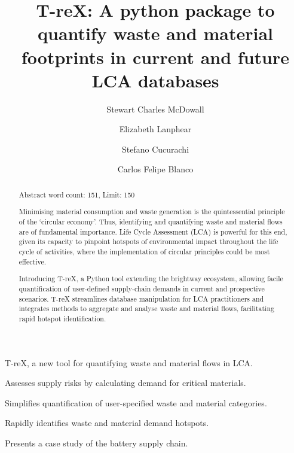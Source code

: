 \documentclass[review,3p,authoryear]{elsarticle}
\newcommand{\cbox}[1]{
    \begin{tcolorbox}[hbox, colback=red!5!white, colframe=red!65!black, boxrule=0.25pt, boxsep=2pt, left=2pt, right=2pt, top=1pt, bottom=1pt]
        \small\sffamily #1
    \end{tcolorbox}
}
\begin{document}
    \begin{highlights}
        \item T-reX, a new tool for quantifying waste and material flows in LCA.
        \item Assesses supply risks by calculating demand for critical materials.
        \item Simplifies quantification of user-specified waste and material categories.
        \item Rapidly identifies waste and material demand hotspots.
        \item Presents a case study of the battery supply chain.
    \end{highlights}


\begin{frontmatter}

    \title{T-reX: A python package to quantify waste and material footprints in current and future LCA databases}
    \author[1]{Stewart Charles McDowall}
    \author[1]{Elizabeth Lanphear}
    \author[1]{Stefano Cucurachi}
    \author[1]{Carlos Felipe Blanco}



    \begin{abstract}
        \cbox{Abstract word count: 151, Limit: 150}
        Minimising material consumption and waste generation is the quintessential principle of the `circular economy'.
        Thus, identifying and quantifying waste and material flows are of fundamental importance. Life Cycle Assessment (LCA) is powerful for this end, given its capacity to pinpoint hotspots of environmental impact throughout the life cycle of activities, where the implementation of circular principles could be most effective.

        Introducing T-reX, a Python tool extending the brightway ecosystem, allowing facile quantification of user-defined supply-chain demands in current and prospective scenarios. T-reX streamlines database manipulation for LCA practitioners and integrates methods to aggregate and analyse waste and material flows, facilitating rapid hotspot identification.


\end{abstract}
\end{frontmatter}
\end{document}
